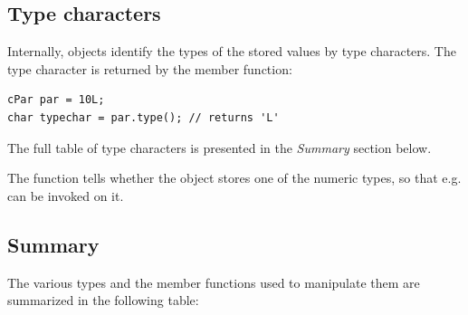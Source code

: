 \subsection{Type characters}

Internally,  objects identify the types of the stored values
by type characters. The type character is returned by the 
member function:

\begin{verbatim}
cPar par = 10L;
char typechar = par.type(); // returns 'L'
\end{verbatim}

The full table of type characters is presented in the \textit{Summary}
section below.

The  function tells whether the object
stores one of the numeric types, so that e.g. 
can be invoked on it.




\subsection{Summary}

The various  types and the member functions used to manipulate them are summarized
in the following table:

